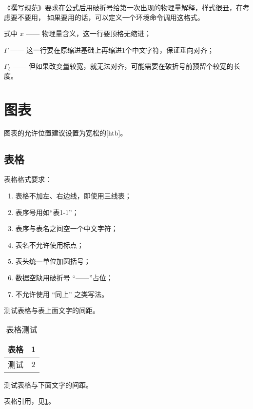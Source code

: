 《撰写规范》要求在公式后用破折号给第一次出现的物理量解释，样式很丑，在考虑要不要用，
如果要用的话，可以定义一个环境命令调用这格式。

\noindent 式中\hspace{\ccwd} $x$ —— 物理量含义，这一行要顶格无缩进；

\hspace{\ccwd} $\Gamma$ —— 这一行要在原缩进基础上再缩进1个中文字符，保证垂向对齐；

\hspace{\ccwd} $\Gamma_\ell$ —— 
但如果改变量较宽，就无法对齐，可能需要在破折号前预留个较宽的长度。

\section{图表}

图表的允许位置建议设置为宽松的[htb]。

\subsection{表格}

表格格式要求：

\begin{enumerate}
	\item 表格不加左、右边线，即使用三线表；
	\item	表序号用如``表1-1''；
	\item 表序与表名之间空一个中文字符；
	\item 表名不允许使用标点；
	\item 表头统一单位加圆括号；
	\item 数据空缺用破折号 ``——''占位；
	\item 不允许使用 ``同上'' 之类写法。
\end{enumerate}

测试表格与表上面文字的间距。

\begin{table}[htb]
	\centering
	\caption{表格测试}
	\label{tab:a}
	\begin{tabular}{cc}
		\toprule
		表格 & 1  \\
		\midrule
		测试 & 2  \\
		\bottomrule
	\end{tabular}
\end{table}

测试表格与下面文字的间距。

表格引用，见\cref{tab:a}。

